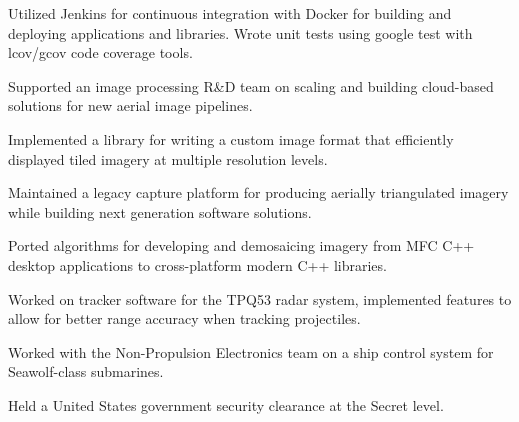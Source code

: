 \documentclass[letterpaper]{fowles-resume} %
\begin{document}
\begin{minipage}[t]{0.66\textwidth}
\begin{tightitemize}
\item Utilized Jenkins for continuous integration with Docker for building and deploying applications and libraries. Wrote unit tests using google test with lcov/gcov code coverage tools.
\end{tightitemize}
\begin{tightitemize}
\item Supported an image processing R\&D team on scaling and building cloud-based solutions for new aerial image pipelines.
\item Implemented a library for writing a custom image format that efficiently displayed tiled imagery at multiple resolution levels.
\end{tightitemize}
\begin{tightitemize}
\item Maintained a legacy capture platform for producing aerially triangulated imagery while building next generation software solutions.
\item Ported algorithms for developing and demosaicing imagery from MFC C++ desktop applications to cross-platform modern C++ libraries. 
\end{tightitemize}

\sectionspace %
\begin{tightitemize}
\item Worked on tracker software for the TPQ53 radar system, implemented features to allow for better range accuracy when tracking projectiles.
\end{tightitemize}
\begin{tightitemize}
\item Worked with the Non-Propulsion Electronics team on a ship control system for Seawolf-class submarines. 
\end{tightitemize}
Held a United States government security clearance at the Secret level. 
\sectionspace %




\end{minipage}
\end{document}
